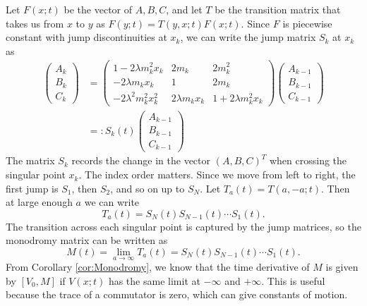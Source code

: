 \documentclass[english,master]{liumaiex}
\theoremstyle{thesisplain}
\theoremstyle{thesisdefinition}
\numberwithin{equation}{section}
\begin{document}
%
Let $F(x;t)$ be the vector of $A, B, C$, and let $T$ be the transition matrix that takes us from $x$ to $y$ as $F(y;t) = T(y,x;t)F(x;t)$. Since $F$ is piecewise constant with jump discontinuities at $x_k$, we can write the jump matrix $S_k$ at $x_k$ as
\begin{equation}
\begin{aligned}
\begin{pmatrix} A_k \\ B_k \\ C_k \end{pmatrix} &= 
\begin{pmatrix}
	1 - 2\lambda m_k^2 x_k & 2m_k & 2m_k^2 \\
	-2\lambda m_k x_k & 1 & 2m_k \\
	-2\lambda^2 m_k^2 x_k^2 & 2\lambda m_k x_k & 1 + 2\lambda m_k^2 x_k
\end{pmatrix}
\begin{pmatrix} A_{k-1} \\ B_{k-1} \\ C_{k-1} \end{pmatrix} \\
&=: S_k(t) 
\begin{pmatrix} A_{k-1} \\ B_{k-1} \\ C_{k-1} \end{pmatrix}
\end{aligned}
\end{equation}
The matrix $S_k$ records the change in the vector $(A,B,C)^T$ when crossing the singular point $x_k$. The index order matters. Since we move from left to right, the first jump is $S_1$, then $S_2$, and so on up to $S_N$.
Let $T_a(t) = T(a,-a;t)$. Then at large enough $a$ we can write
\begin{equation}
	T_a(t) = S_N(t)S_{N-1}(t) \cdots S_1(t).
\end{equation}
The transition across each singular point is captured by the jump matrices, so the monodromy matrix can be written as
\begin{equation}
	M(t) = \lim_{a \rightarrow \infty} T_a(t) = S_N(t)S_{N-1}(t) \cdots S_1(t).
\end{equation}
From Corollary \ref{cor:Monodromy}, we know that the time derivative of $M$ is given by $[V_0, M]$ if $V(x;t)$ has the same limit at $-\infty$ and $+\infty$. This is useful because the trace of a commutator is zero, which can give constants of motion.
\end{document}
